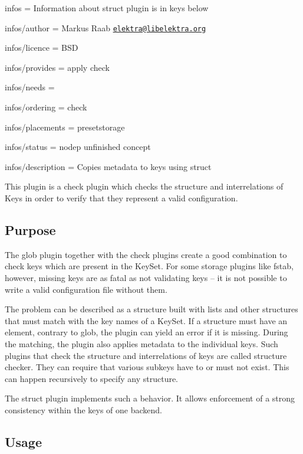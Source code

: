 
\begin{DoxyItemize}
\item infos = Information about struct plugin is in keys below
\item infos/author = Markus Raab \href{mailto:elektra@libelektra.org}{\tt elektra@libelektra.\+org}
\item infos/licence = B\+SD
\item infos/provides = apply check
\item infos/needs =
\item infos/ordering = check
\item infos/placements = presetstorage
\item infos/status = nodep unfinished concept
\item infos/description = Copies metadata to keys using struct
\end{DoxyItemize}

This plugin is a check plugin which checks the structure and interrelations of Keys in order to verify that they represent a valid configuration.

\subsection*{Purpose}

The glob plugin together with the check plugins create a good combination to check keys which are present in the Key\+Set. For some storage plugins like fstab, however, missing keys are as fatal as not validating keys – it is not possible to write a valid configuration file without them.

The problem can be described as a structure built with lists and other structures that must match with the key names of a Key\+Set. If a structure must have an element, contrary to glob, the plugin can yield an error if it is missing. During the matching, the plugin also applies metadata to the individual keys. Such plugins that check the structure and interrelations of keys are called structure checker. They can require that various subkeys have to or must not exist. This can happen recursively to specify any structure.

The struct plugin implements such a behavior. It allows enforcement of a strong consistency within the keys of one backend.

\subsection*{Usage}

